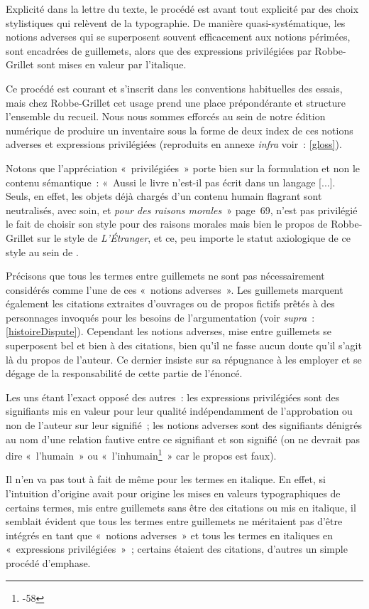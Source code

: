 Explicité dans la lettre du texte, le procédé est avant tout explicité par des choix stylistiques qui relèvent de la typographie. De manière quasi-systématique, les notions adverses qui se superposent souvent efficacement aux notions périmées, sont encadrées de guillemets, alors que des expressions privilégiées par Robbe-Grillet sont mises en valeur par l'italique.

Ce procédé est courant et s'inscrit dans les conventions habituelles des essais, mais chez Robbe-Grillet cet usage prend une place prépondérante et structure l'ensemble du recueil. Nous nous sommes efforcés au sein de notre édition numérique de produire un inventaire sous la forme de deux index de ces notions adverses et expressions privilégiées (reproduits en annexe \textit{infra} voir~: \ref{gloss}).

Notons que l'appréciation «~privilégiées~» porte bien sur la formulation et non le contenu sémantique~: «~Aussi le livre n’est-il pas écrit dans un langage [...]. Seuls, en effet, les objets déjà chargés d’un contenu humain flagrant sont neutralisés, avec soin, et \textit{pour des raisons morales}~» page~69, n'est pas privilégié le fait de choisir son style pour des raisons morales mais bien le propos de Robbe-Grillet sur le style de \textit{L'Étranger}, et ce, peu importe le statut axiologique de ce style au sein de \punr{}.

Précisons que tous les termes entre guillemets ne sont pas nécessairement considérés comme l'une de ces «~notions adverses~». Les guillemets marquent également les citations extraites d'ouvrages ou de propos fictifs prêtés à des personnages invoqués pour les besoins de l'argumentation (voir \textit{supra}~: \ref{histoireDispute}). Cependant les notions adverses, mise entre guillemets se superposent bel et bien à des citations, bien qu'il ne fasse aucun doute qu'il s'agit là du propos de l'auteur. Ce dernier insiste sur sa répugnance à les employer et se dégage de la responsabilité de cette partie de l'énoncé. 

Les uns étant l'exact opposé des autres~: les expressions privilégiées sont des signifiants mis en valeur pour leur qualité indépendamment de l'approbation ou non de l'auteur sur leur signifié~; les notions adverses sont des signifiants dénigrés au nom d'une relation fautive entre ce signifiant et son signifié (on ne devrait pas dire «~l'humain~» ou «~l'inhumain\footnote{-58}~» car le propos est faux).


Il n'en va pas tout à fait de même pour les termes en italique. En effet, si l'intuition d'origine avait pour origine les mises en valeurs typographiques de certains termes, mis entre guillemets sans être des citations ou mis en italique, il semblait évident que tous les termes entre guillemets ne méritaient pas d'être intégrés en tant que «~notions adverses~» et tous les termes en italiques en «~expressions privilégiées~»~; certains étaient des citations, d'autres un simple procédé d'emphase.

